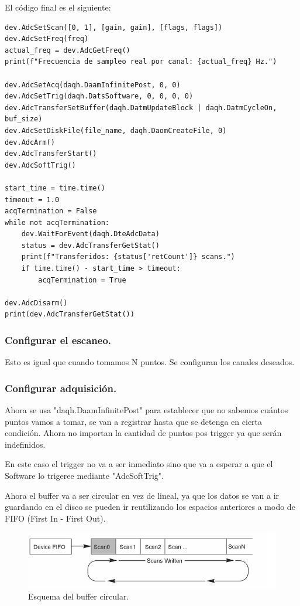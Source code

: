 El código final es el siguiente:
\begin{lstlisting}
dev.AdcSetScan([0, 1], [gain, gain], [flags, flags])
dev.AdcSetFreq(freq)
actual_freq = dev.AdcGetFreq()
print(f"Frecuencia de sampleo real por canal: {actual_freq} Hz.")

dev.AdcSetAcq(daqh.DaamInfinitePost, 0, 0)
dev.AdcSetTrig(daqh.DatsSoftware, 0, 0, 0, 0)
dev.AdcTransferSetBuffer(daqh.DatmUpdateBlock | daqh.DatmCycleOn, buf_size)
dev.AdcSetDiskFile(file_name, daqh.DaomCreateFile, 0)
dev.AdcArm()
dev.AdcTransferStart()
dev.AdcSoftTrig()

start_time = time.time()
timeout = 1.0 
acqTermination = False
while not acqTermination:
	dev.WaitForEvent(daqh.DteAdcData)  
	status = dev.AdcTransferGetStat()
	print(f"Transferidos: {status['retCount']} scans.")
	if time.time() - start_time > timeout:
		acqTermination = True

dev.AdcDisarm()
print(dev.AdcTransferGetStat())

\end{lstlisting}


\subsubsection*{Configurar el escaneo.}
Esto es igual que cuando tomamos N puntos. Se configuran los canales deseados.


\subsubsection*{Configurar adquisición.}
Ahora se usa "daqh.DaamInfinitePost" para establecer que no sabemos cuántos puntos vamos a tomar, se van a registrar hasta que se detenga en cierta condición. Ahora no importan la cantidad de puntos pos trigger ya que serán indefinidos. 

En este caso el trigger no va a ser inmediato sino que va a esperar a que el Software lo trigeree mediante "AdcSoftTrig".

Ahora el buffer va a ser circular en vez de lineal, ya que los datos se van a ir guardando en el disco se pueden ir reutilizando los espacios anteriores a modo de FIFO (First In - First Out). 


\begin{figure}[th!]
	\centering
	\includegraphics[width=0.78\linewidth]{Figures/09_06_2025/Buffer_circular}
	\caption{Esquema del buffer circular.}
	\label{fig:buffercircular}
\end{figure}

